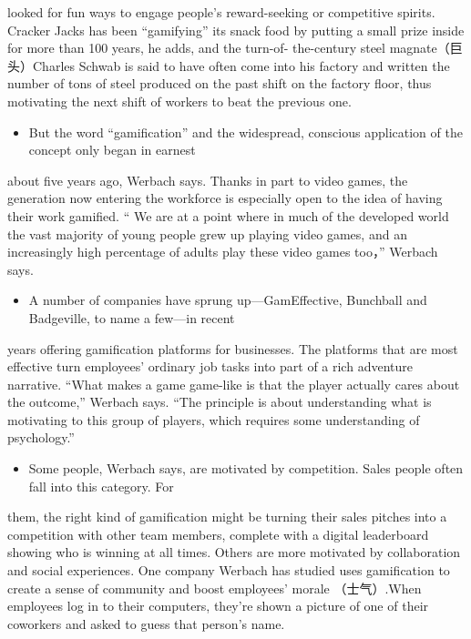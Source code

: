 \documentclass[UTF8,11pt]{ctexart}
\begin{document}
looked for fun ways to engage people’s reward-seeking or competitive spirits. Cracker Jacks has been “gamifying” its snack food by putting a small prize inside for more than 100 years, he adds, and the turn-of- the-century steel magnate（巨头）Charles Schwab is said to have often come into his factory and written the number of tons of steel produced on the past shift on the factory floor, thus motivating the next shift of workers to beat the previous one.


\begin{itemize}[leftmargin=2em,itemsep=.2em,topsep=.4em]\item[E.] But the word “gamification” and the widespread, conscious application of the concept only began in earnest
\end{itemize}

about five years ago, Werbach says. Thanks in part to video games, the generation now entering the workforce is especially open to the idea of having their work gamified. “ We are at a point where in much of the developed world the vast majority of young people grew up playing video games, and an increasingly high percentage of adults play these video games too，” Werbach says.


\begin{itemize}[leftmargin=2em,itemsep=.2em,topsep=.4em]\item[F.] A number of companies have sprung up—GamEffective, Bunchball and Badgeville, to name a few—in recent
\end{itemize}

years offering gamification platforms for businesses. The platforms that are most effective turn employees’ ordinary job tasks into part of a rich adventure narrative. “What makes a game game-like is that the player actually cares about the outcome,” Werbach says. “The principle is about understanding what is motivating to this group of players, which requires some understanding of psychology.”


\begin{itemize}[leftmargin=2em,itemsep=.2em,topsep=.4em]\item[G.] Some people, Werbach says, are motivated by competition. Sales people often fall into this category. For
\end{itemize}

them, the right kind of gamification might be turning their sales pitches into a competition with other team members, complete with a digital leaderboard showing who is winning at all times. Others are more motivated by collaboration and social experiences. One company Werbach has studied uses gamification to create a sense of community and boost employees’ morale （士气）.When employees log in to their computers, they’re shown a picture of one of their coworkers and asked to guess that person’s name.
\end{document}
